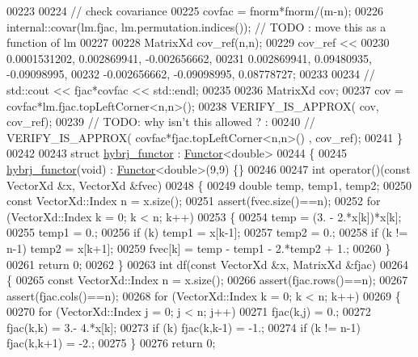 \begin{DoxyCode}
00223 
00224   \textcolor{comment}{// check covariance}
00225   covfac = fnorm*fnorm/(m-n);
00226   internal::covar(lm.fjac, lm.permutation.indices()); \textcolor{comment}{// TODO : move this as a function of lm}
00227 
00228   MatrixXd cov\_ref(n,n);
00229   cov\_ref <<
00230       0.0001531202,   0.002869941,  -0.002656662,
00231       0.002869941,    0.09480935,   -0.09098995,
00232       -0.002656662,   -0.09098995,    0.08778727;
00233 
00234 \textcolor{comment}{//  std::cout << fjac*covfac << std::endl;}
00235 
00236   MatrixXd cov;
00237   cov =  covfac*lm.fjac.topLeftCorner<n,n>();
00238   VERIFY\_IS\_APPROX( cov, cov\_ref);
00239   \textcolor{comment}{// TODO: why isn't this allowed ? :}
00240   \textcolor{comment}{// VERIFY\_IS\_APPROX( covfac*fjac.topLeftCorner<n,n>() , cov\_ref);}
00241 \}
00242 
00243 \textcolor{keyword}{struct }\hyperlink{structhybrj__functor}{hybrj\_functor} : \hyperlink{struct_functor}{Functor}<double>
00244 \{
00245     \hyperlink{structhybrj__functor}{hybrj\_functor}(\textcolor{keywordtype}{void}) : \hyperlink{struct_functor}{Functor}<double>(9,9) \{\}
00246 
00247     \textcolor{keywordtype}{int} operator()(\textcolor{keyword}{const} VectorXd &x, VectorXd &fvec)
00248     \{
00249         \textcolor{keywordtype}{double} temp, temp1, temp2;
00250         \textcolor{keyword}{const} VectorXd::Index n = x.size();
00251         assert(fvec.size()==n);
00252         \textcolor{keywordflow}{for} (VectorXd::Index k = 0; k < n; k++)
00253         \{
00254             temp = (3. - 2.*x[k])*x[k];
00255             temp1 = 0.;
00256             \textcolor{keywordflow}{if} (k) temp1 = x[k-1];
00257             temp2 = 0.;
00258             \textcolor{keywordflow}{if} (k != n-1) temp2 = x[k+1];
00259             fvec[k] = temp - temp1 - 2.*temp2 + 1.;
00260         \}
00261         \textcolor{keywordflow}{return} 0;
00262     \}
00263     \textcolor{keywordtype}{int} df(\textcolor{keyword}{const} VectorXd &x, MatrixXd &fjac)
00264     \{
00265         \textcolor{keyword}{const} VectorXd::Index n = x.size();
00266         assert(fjac.rows()==n);
00267         assert(fjac.cols()==n);
00268         \textcolor{keywordflow}{for} (VectorXd::Index k = 0; k < n; k++)
00269         \{
00270             \textcolor{keywordflow}{for} (VectorXd::Index j = 0; j < n; j++)
00271                 fjac(k,j) = 0.;
00272             fjac(k,k) = 3.- 4.*x[k];
00273             \textcolor{keywordflow}{if} (k) fjac(k,k-1) = -1.;
00274             \textcolor{keywordflow}{if} (k != n-1) fjac(k,k+1) = -2.;
00275         \}
00276         \textcolor{keywordflow}{return} 0;

\end{DoxyCode}
